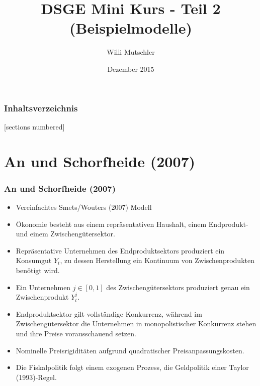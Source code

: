 \documentclass[10pt]{beamer}  %
\title{DSGE Mini Kurs - Teil 2 (Beispielmodelle)}
\author{Willi Mutschler}
\date{Dezember 2015}
\begin{document}
\begin{frame}
    \titlepage
\end{frame}

\begin{frame}\frametitle{Inhaltsverzeichnis}
[sections numbered]
  \tableofcontents
\end{frame}


\section{An und Schorfheide (2007)}

\begin{frame}
\frametitle{An und Schorfheide (2007)}
\begin{itemize}
  \item Vereinfachtes Smets/Wouters (2007) Modell
  \item \"{O}konomie besteht aus einem repr\"{a}sentativen Haushalt, einem Endprodukt- und einem Zwischeng\"{u}tersektor.
  \item Repr\"{a}sentative Unternehmen des Endproduktsektors produziert ein Konsumgut $Y_t$, zu dessen Herstellung ein Kontinuum von Zwischenprodukten ben\"{o}tigt wird.
  \item Ein Unternehmen $j \in [0,1]$ des Zwischeng\"{u}tersektors produziert genau ein Zwischenprodukt $Y_t^j$.
  \item Endproduktsektor gilt vollst\"{a}ndige Konkurrenz, w\"{a}hrend im Zwischeng\"{u}tersektor die Unternehmen in monopolistischer Konkurrenz stehen und ihre Preise vorausschauend setzen.
  \item Nominelle Preisrigidit\"{a}ten aufgrund quadratischer Preisanpassungskosten.
  \item Die Fiskalpolitik folgt einem exogenen Prozess, die Geldpolitik einer Taylor (1993)-Regel.
\end{itemize}
\end{frame}
\end{document}
